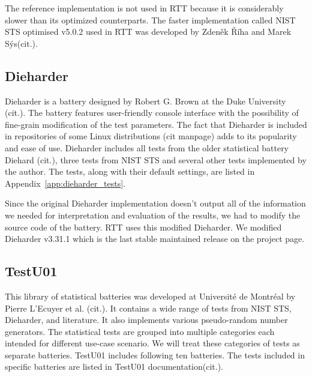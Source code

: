 \documentclass[
  digital,  	%
  color,		%
  oneside,   	%
  12pt,
  nocover,
  notable,
  nolof,
  nolot,
]{fithesis3}
\theoremstyle{definition}
\theoremstyle{remark}
\begin{document}
The reference implementation is not used in RTT because it is considerably slower than its optimized counterparts. The faster implementation called NIST STS optimised v5.0.2 used in RTT was developed by Zdeněk Říha and Marek Sýs(cit.).

\subsection{Dieharder}
Dieharder is a battery designed by Robert G. Brown at the Duke University (cit.). The battery features user-friendly console interface with the possibility of fine-grain modification of the test parameters. The fact that Dieharder is included in repositories of some Linux distributions (cit manpage) adds to its popularity and ease of use. Dieharder includes all tests from the older statistical battery Diehard (cit.), three tests from NIST STS and several other tests implemented by the author. The tests, along with their default settings, are listed in Appendix~\ref{app:dieharder_tests}.

Since the original Dieharder implementation doesn't output all of the information we needed for interpretation and evaluation of the results, we had to modify the source code of the battery. RTT uses this modified Dieharder. We modified Dieharder v3.31.1 which is the last stable maintained release on the project page.

\subsection{TestU01}
This library of statistical batteries was developed at Université de Montréal by Pierre L’Ecuyer et al. (cit.). It contains a wide range of tests from NIST STS, Dieharder, and literature. It also implements various pseudo-random number generators. The statistical tests are grouped into multiple categories each intended for different use-case scenario. We will treat these categories of tests as separate batteries. TestU01 includes following ten batteries. The tests included in specific batteries are listed in TestU01 documentation(cit.).
\end{document}
